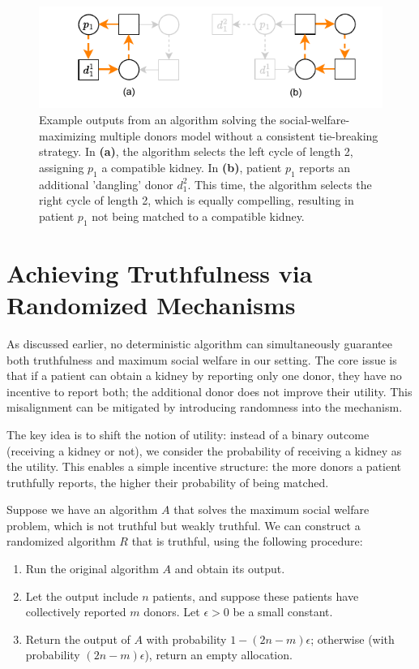 \begin{figure}
    \centering
    \includegraphics{data/weak_truthfulness.pdf}
    \caption[An example output of an algorithm without a consistent tie-breaking strategy.]{Example outputs from an algorithm solving the social-welfare-maximizing multiple donors model without a consistent tie-breaking strategy. In \textbf{(a)}, the algorithm selects the left cycle of length 2, assigning $p_1$ a compatible kidney. In \textbf{(b)}, patient $p_1$ reports an additional 'dangling' donor $d_1^2$. This time, the algorithm selects the right cycle of length 2, which is equally compelling, resulting in patient $p_1$ not being matched to a compatible kidney.}
    \label{fig:weak_truthfulness}
\end{figure}


\section{Achieving Truthfulness via Randomized Mechanisms}

As discussed earlier, no deterministic algorithm can simultaneously guarantee both truthfulness and maximum social welfare in our setting. The core issue is that if a patient can obtain a kidney by reporting only one donor, they have no incentive to report both; the additional donor does not improve their utility. This misalignment can be mitigated by introducing randomness into the mechanism.

The key idea is to shift the notion of utility: instead of a binary outcome (receiving a kidney or not), we consider the probability of receiving a kidney as the utility. This enables a simple incentive structure: the more donors a patient truthfully reports, the higher their probability of being matched.

Suppose we have an algorithm $A$ that solves the maximum social welfare problem, which is not truthful but weakly truthful. We can construct a randomized algorithm $R$ that is truthful, using the following procedure:

\begin{enumerate}
    \item Run the original algorithm $A$ and obtain its output.
    \item Let the output include $n$ patients, and suppose these patients have collectively reported $m$ donors. Let $\epsilon > 0$ be a small constant.
    \item Return the output of $A$ with probability $1 - (2n - m)\epsilon$; otherwise (with probability $(2n - m)\epsilon$), return an empty allocation.
\end{enumerate}

